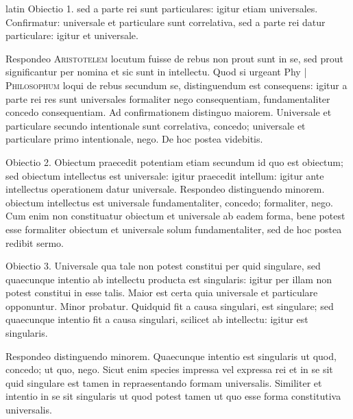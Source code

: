 \begin{otherlanguage*}{latin}
\pstart
  Obiectio 1.  sed a parte rei sunt particulares: igitur etiam universales. Confirmatur: universale et particulare sunt correlativa, sed a parte rei datur particulare: igitur et universale. 
\pend

\pstart
  Respondeo \textsc{Aristotelem} locutum fuisse de rebus non prout sunt in se, sed prout significantur per nomina et sic sunt in intellectu. Quod si urgeant Phy \textnormal{|}    \textsc{Philosophum} loqui de rebus secundum se, distinguendum est consequens: igitur a parte rei res sunt universales formaliter nego consequentiam, fundamentaliter concedo consequentiam. Ad confirmationem distinguo maiorem. Universale et particulare secundo intentionale sunt correlativa, concedo; universale et particulare primo intentionale, nego. De hoc postea videbitis. 
\pend

\pstart
  Obiectio 2. Obiectum praecedit potentiam etiam secundum id quo est obiectum; sed obiectum intellectus est universale: igitur praecedit intellum: igitur ante intellectus operationem datur universale. Respondeo distinguendo minorem. obiectum intellectus est universale fundamentaliter, concedo; formaliter, nego. Cum enim non constituatur obiectum et universale ab eadem forma, bene potest esse formaliter obiectum et universale solum fundamentaliter, sed de hoc postea redibit sermo. 
\pend

\pstart
  Obiectio 3. Universale qua tale non potest constitui per quid singulare, sed quaecunque intentio ab intellectu producta est singularis: igitur per illam non potest constitui in esse talis. Maior est certa quia universale et particulare opponuntur. Minor probatur. Quidquid fit a causa singulari, est singulare; sed quaecunque intentio fit a causa singulari, scilicet ab intellectu: igitur est singularis. 
\pend

\pstart
  Respondeo distinguendo minorem. Quaecunque intentio est singularis ut quod, concedo; ut quo, nego. Sicut enim species impressa vel expressa rei et in se sit quid singulare est tamen in repraesentando formam universalis. Similiter et intentio in se sit singularis ut quod potest tamen ut quo esse forma constitutiva universalis. 
\pend


\end{otherlanguage*}
